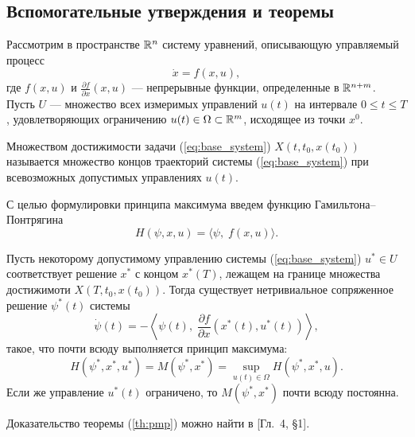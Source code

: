 \subsection{Вспомогательные утверждения и теоремы}

Рассмотрим в пространстве $\mathbb{R}^n$ систему уравнений, описывающую управляемый процесс
\begin{equation} \label{eq:base_system}
\dot x = f(x, u),
\end{equation}
где $f(x, u)$ и $\frac{\partial f}{\partial x}(x, u)$ --- непрерывные функции, определенные в $\mathbb{R}^{n+m}$. Пусть $U$ --- множество всех измеримых управлений $u(t)$ на интервале $0 \leqslant t \leqslant T$, удовлетворяющих ограничению $u(t) \in \Omega \subset \mathbb{R}^m$, исходящее из точки $x^0$.

\theoremstyle{definition}
\begin{definition}
        Множеством достижимости задачи (\ref{eq:base_system}) $X(t, t_0, x(t_0))$ называется множество концов траекторий системы (\ref{eq:base_system}) при всевозможных допустимых управлениях $u(t)$.
\end{definition}
С целью формулировки принципа максимума введем функцию Гамильтона--Понтрягина
$$
        H(\psi, x, u) = \langle \psi,\; f(x, u) \rangle.
$$

\begin{theorem} \label{th:pmp}
        Пусть некоторому допустимому управлению системы (\ref{eq:base_system}) $u^* \in U$ соответствует решение $x^*$ с концом $x^*(T)$, лежащем на границе множества достижимоти $X(T, t_0, x(t_0))$. Тогда существует нетривиальное сопряженное решение $\psi^*(t)$ системы
        $$
                \dot \psi(t) = -\left\langle \psi(t),\;\frac{\partial f}{\partial x} (x^*(t), u^*(t))\right\rangle,
        $$
        такое, что почти всюду выполняется принцип максимума:
        $$
                H(\psi^*, x^*, u^*) = M(\psi^*, x^*) = \sup\limits_{u(t) \in \Omega} H(\psi^*, x^*, u).
        $$
        Если же управление $u^*(t)$ ограничено, то $M(\psi^*, x^*)$ почти всюду постоянна.
\end{theorem}

Доказательство теоремы (\ref{th:pmp}) можно найти в \cite{li72}[Гл.~4, \S1].